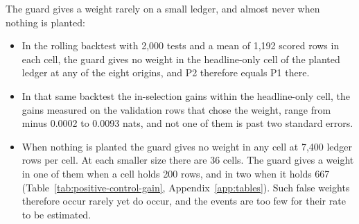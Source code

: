 The guard gives a weight rarely on a small ledger, and almost never when nothing is planted:
\begin{itemize}
\item In the rolling backtest with 2,000 tests and a mean of 1,192 scored rows in each cell, the guard gives no weight in the headline-only cell of the planted ledger at any of the eight origins, and P2 therefore equals P1 there.
\item In that same backtest the in-selection gains within the headline-only cell, the gains measured on the validation rows that chose the weight, range from minus 0.0002 to 0.0093 nats, and not one of them is past two standard errors.
\item When nothing is planted the guard gives no weight in any cell at 7,400 ledger rows per cell. At each smaller size there are 36 cells. The guard gives a weight in one of them when a cell holds 200 rows, and in two when it holds 667 (Table~\ref{tab:positive-control-gain}, Appendix~\ref{app:tables}). Such false weights therefore occur rarely yet do occur, and the events are too few for their rate to be estimated.
\end{itemize}

